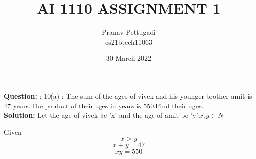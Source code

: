 \documentclass[journal,12pt,twocolumn]{IEEEtran}
\begin{document}



\providecommand{\pr}[1]{\ensuremath{\Pr\left(#1\right)}}
\providecommand{\qfunc}[1]{\ensuremath{Q\left(#1\right)}}
\providecommand{\sbrak}[1]{\ensuremath{{}\left[#1\right]}}
\providecommand{\lsbrak}[1]{\ensuremath{{}\left[#1\right.}}
\providecommand{\rsbrak}[1]{\ensuremath{{}\left.#1\right]}}
\providecommand{\brak}[1]{\ensuremath{\left(#1\right)}}
\providecommand{\lbrak}[1]{\ensuremath{\left(#1\right.}}
\providecommand{\rbrak}[1]{\ensuremath{\left.#1\right)}}
\providecommand{\cbrak}[1]{\ensuremath{\left\{#1\right\}}}
\providecommand{\lcbrak}[1]{\ensuremath{\left\{#1\right.}}
\providecommand{\rcbrak}[1]{\ensuremath{\left.#1\right\}}}
\theoremstyle{remark}
\newtheorem{rem}{Remark}
\newcommand{\sgn}{\mathop{\mathrm{sgn}}}

\providecommand{\system}{\overset{\mathcal{H}}{ \longleftrightarrow}}
\newcommand{\question}{\noindent \textbf{Question: }}	
\newcommand{\solution}{\noindent \textbf{Solution: }}

\providecommand{\dec}[2]{\ensuremath{\overset{#1}{\underset{#2}{\gtrless}}}}

\let\vec\mathbf

\newcommand{\myvec}[1]{\ensuremath{\begin{pmatrix}#1\end{pmatrix}}}
\newcommand{\mydet}[1]{\ensuremath{\begin{vmatrix}#1\end{vmatrix}}}
\title{AI 1110 ASSIGNMENT 1}
\author{Pranav Pettugadi\\cs21btech11063}
\date{30 March 2022}
\maketitle

\question : 10(a) :
  The sum of the ages of vivek and his younger brother amit is 47 years.The product of their ages in years is 550.Find their ages.
 \\
  \solution
  Let the age of vivek be 'x' and the age of amit be 'y'.$ x,y \in N$
  
  Given
  \begin{equation}
\label{maineq}
x>y
  \end{equation}
 \begin{equation}
\label{eq1}
     x+y=47
 \end{equation}
\begin{equation}
 \label{eq2}
 xy=550
\end{equation}
 
\end{document}
